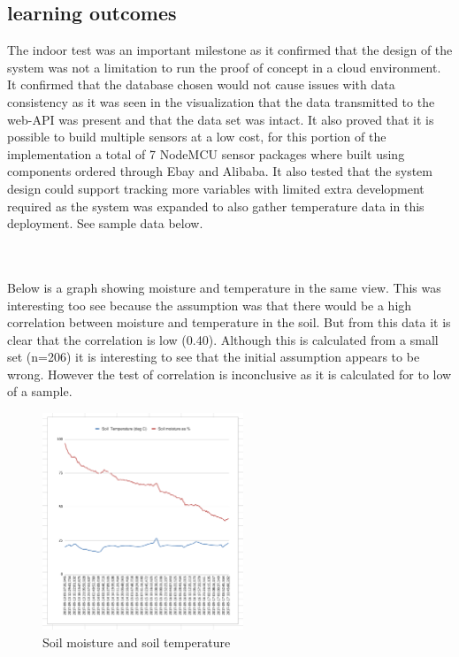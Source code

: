 \documentclass[]{uiophd}
\begin{document}
\subsection{learning outcomes}
The indoor test was an important milestone as it confirmed that the design of the system was not a limitation to run the proof of concept in a cloud environment. It confirmed that the database chosen would not cause issues with data consistency as it was seen in the visualization that the data transmitted to the web-API was present and that the data set was intact. It also proved that it is possible to build multiple sensors at a low cost, for this portion of the implementation a total of 7 NodeMCU sensor packages where built using components ordered through Ebay and Alibaba. It also tested that the system design could support tracking more variables with limited extra development required as the system was expanded to also gather temperature data in this deployment. See sample data below.


\\\\
Below is a graph showing moisture and temperature in the same view. This was interesting too see because the assumption was that there would be a high correlation between moisture and temperature in the soil. But from this data it is clear that the correlation is low (0.40). Although this is calculated from a small set (n=206) it is interesting to see that the initial assumption appears to be wrong. However the test of correlation is inconclusive as it is calculated for to low of a sample.


 \begin{figure}[h]
\caption{Soil moisture and soil temperature }
\centering
\includegraphics[width=6cm]{moistureandtemp.png}
\end{figure}
\end{document}

